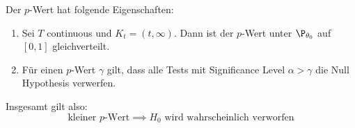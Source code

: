 Der \(p\)-Wert hat folgende Eigenschaften:
\begin{enumerate}
	\item Sei \(T\) continuous und \(K_t = (t, \infty)\). Dann ist der \(p\)-Wert unter \(\P_{\theta_0}\) auf \([0,1]\) gleichverteilt.
	\item Für einen \(p\)-Wert \(\gamma\) gilt, dass alle Tests mit Significance Level \(\alpha > \gamma\) die Null Hypothesis verwerfen.
\end{enumerate}

Insgesamt gilt also:
\[\text{kleiner } p\text{-Wert} \implies H_0 \text{ wird wahrscheinlich verworfen} \]

